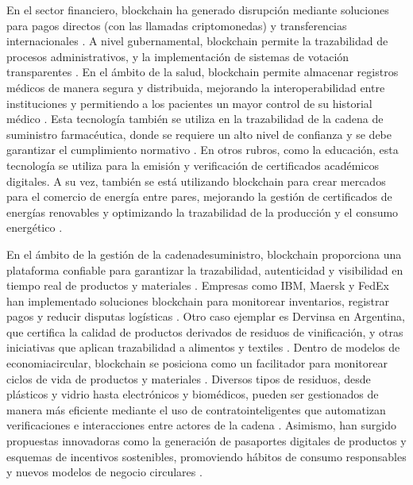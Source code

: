 
En el sector financiero, blockchain ha generado disrupción mediante soluciones para pagos directos (con las llamadas \glspl{criptomoneda}) y transferencias internacionales \cite{bartolomeo2020introduccion}. A nivel gubernamental, blockchain permite la \gls{trazabilidad} de procesos administrativos, y la implementación de sistemas de votación transparentes \cite{vaigandla2023review}. En el ámbito de la salud, blockchain permite almacenar registros médicos de manera segura y distribuida, mejorando la interoperabilidad entre instituciones y permitiendo a los pacientes un mayor control de su historial médico \cite{sunny2022systematic}. Esta tecnología también se utiliza en la trazabilidad de la cadena de suministro farmacéutica, donde se requiere un alto nivel de confianza y se debe garantizar el cumplimiento normativo \cite{vaigandla2023review}. En otros rubros, como la educación, esta tecnología se utiliza para la emisión y verificación de certificados académicos digitales. A su vez, también se está utilizando blockchain para crear mercados para el comercio de energía entre pares, mejorando la gestión de certificados de energías renovables y optimizando la trazabilidad de la producción y el consumo energético \cite{sunny2022systematic, vaigandla2023review}.

En el ámbito de la gestión de la \gls{cadenadesuministro}, blockchain proporciona una plataforma confiable para garantizar la trazabilidad, autenticidad y visibilidad en tiempo real de productos y materiales \cite{torres2022tendencias, sharabati2024blockchain}. Empresas como IBM, Maersk y FedEx han implementado soluciones blockchain para monitorear inventarios, registrar pagos y reducir disputas logísticas \cite{tripathi2023comprehensive}. Otro caso ejemplar es Dervinsa en Argentina, que certifica la calidad de productos derivados de residuos de vinificación, y otras iniciativas que aplican trazabilidad a alimentos y textiles \cite{bartolomeo2020introduccion}. Dentro de modelos de \gls{economiacircular}, blockchain se posiciona como un facilitador para monitorear ciclos de vida de productos y materiales \cite{bulkowska2023implementation, baralla2023waste}. Diversos tipos de residuos, desde plásticos y vidrio hasta electrónicos y biomédicos, pueden ser gestionados de manera más eficiente mediante el uso de \glspl{contratointeligente} que automatizan verificaciones e interacciones entre actores de la cadena \cite{baralla2023waste}. Asimismo, han surgido propuestas innovadoras como la generación de pasaportes digitales de productos y esquemas de incentivos sostenibles, promoviendo hábitos de consumo responsables y nuevos modelos de negocio circulares \cite{baralla2023waste}.

